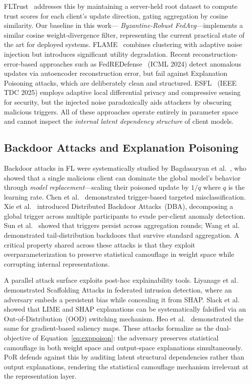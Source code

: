 \documentclass[journal]{IEEEtran}
\newcommand{\por}{\textsc{PoR}}
\begin{document}
FLTrust~\cite{cao2021fltrust} addresses this by maintaining a server-held
root dataset to compute trust scores for each client's update direction,
gating aggregation by cosine similarity. Our baseline in this work---
\textit{Byzantine-Robust FedAvg}---implements a similar cosine
weight-divergence filter, representing the current practical state of
the art for deployed systems. FLAME~\cite{nguyen2021flame} combines
clustering with adaptive noise injection but introduces significant
utility degradation. Recent reconstruction-error-based approaches such as
FedREDefense~\cite{zhang2024fedredefense} (ICML 2024) detect anomalous
updates via autoencoder reconstruction error, but fail against Explanation
Poisoning attacks, which are deliberately clean and structured.
ESFL~\cite{esfl2025} (IEEE TDC 2025) employs adaptive local differential
privacy and compressive sensing for security, but the injected noise
paradoxically aids attackers by obscuring malicious triggers. All of these
approaches operate entirely in parameter space and cannot inspect the
\textit{internal latent dependency structure} of client models.

\subsection{Backdoor Attacks and Explanation Poisoning}

Backdoor attacks in FL were systematically studied by
Bagdasaryan et al.~\cite{bagdasaryan2020backdoor}, who showed that a single
malicious client can dominate the global model's behavior through
\textit{model replacement}---scaling their poisoned update by $1/q$ where
$q$ is the learning rate. Chen et al.~\cite{chen2017backdoor} demonstrated
trigger-based targeted misclassification. Xie et al.~\cite{xie2020dba}
introduced Distributed Backdoor Attacks~(DBA), decomposing a global trigger
across multiple participants to evade per-client anomaly detection.
Sun et al.~\cite{sun2019backdoor} showed that triggers persist across
aggregation rounds; Wang et al.~\cite{wang2020edge} demonstrated
tail-distribution backdoors that survive standard aggregation.
A critical property shared across these attacks is that they exploit
overparameterization to preserve statistical camouflage in weight space
while corrupting internal representations.

A parallel attack surface exploits post-hoc explainability tools.
Liyanage et al.~\cite{liyanage2024scaffolding} demonstrated Scaffolding
Attacks in federated intrusion detection, where an adversary embeds a
persistent bias while concealing it from SHAP.
Slack et al.~\cite{slack2020fooling} showed that LIME and SHAP explanations
can be systematically falsified via an Out-of-Distribution~(OOD) switching
mechanism. Heo et al.~\cite{heo2019fooling} demonstrated the same for
gradient-based saliency maps. These attacks formalize as the dual-objective
of Equation~\eqref{eq:exppoison}: the adversary preserves statistical
camouflage in both weight space and output-space explanations simultaneously.
\por{} defends against this by auditing latent structural dependencies rather
than output explanations, rendering the statistical camouflage mechanism
irrelevant at the representation layer.
\end{document}
